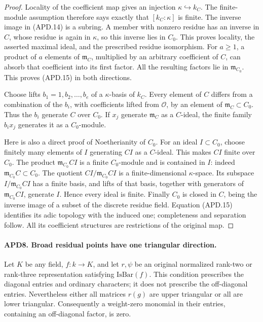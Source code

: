 \documentclass[11pt,a4paper]{article}
\numberwithin{equation}{section}
\theoremstyle{remark}\newtheorem{remark}[theorem]{Remark}
\begin{document}
\begin{proof}
Locality of the coefficient map gives an injection
\(\kappa\hookrightarrow k_C\).  The finite-module assumption
therefore says exactly that \([k_C:\kappa]\) is finite.
The inverse image in (APD.14) is a subring.  A member with nonzero
residue has an inverse in \(C\), whose residue is again in
\(\kappa\), so this inverse lies in \(C_0\).  This proves
locality, the asserted maximal ideal, and the prescribed residue
isomorphism.  For \(a\ge1\), a product of \(a\) elements
of \(\mathfrak m_C\), multiplied by an arbitrary coefficient
of \(C\), can absorb that coefficient into its first factor.
All the resulting factors lie in \(\mathfrak m_{C_0}\).
This proves (APD.15) in both directions.

Choose lifts \(b_1=1,b_2,\ldots,b_e\) of a
\(\kappa\)-basis of \(k_C\).  Every element of \(C\)
differs from a combination of the \(b_i\), with coefficients
lifted from \(\mathcal O\), by an element of
\(\mathfrak m_C\subset C_0\).  Thus the \(b_i\) generate
\(C\) over \(C_0\).  If \(x_j\) generate \(\mathfrak m_C\)
as a \(C\)-ideal, the finite family \(b_ix_j\) generates it
as a \(C_0\)-module.

Here is also a direct proof of Noetherianity of \(C_0\).
For an ideal \(I\subset C_0\), choose finitely many elements
of \(I\) generating \(CI\) as a \(C\)-ideal.  This makes
\(CI\) finite over \(C_0\).  The product
\(\mathfrak m_{C_0}CI\) is a finite \(C_0\)-module and is
contained in \(I\): indeed \(\mathfrak m_{C_0}C\subset C_0\).
The quotient \(CI/\mathfrak m_{C_0}CI\) is a finite-dimensional
\(\kappa\)-space.  Its subspace
\(I/\mathfrak m_{C_0}CI\) has a finite basis, and lifts of
that basis, together with generators of
\(\mathfrak m_{C_0}CI\), generate \(I\).  Hence every ideal
is finite.  Finally \(C_0\) is closed in \(C\), being the
inverse image of a subset of the discrete residue field.
Equation (APD.15) identifies its adic topology with the induced
one; completeness and separation follow.  All its coefficient
structures are restrictions of the original map.
\end{proof}

\paragraph{APD8. Broad residual points have one triangular direction.}
\label{claim:APD8}
Let \(K\) be any field, \(f:k\to K\), and let
\(r,\psi\) be an original normalized rank-two or rank-three
representation satisfying \(\mathrm{IsBar}(f)\).  This condition
prescribes the diagonal entries and ordinary characters; it does
not prescribe the off-diagonal entries.  Nevertheless either all
matrices \(r(g)\) are upper triangular or all are lower triangular.
Consequently a weight-zero monomial in their entries, containing
an off-diagonal factor, is zero.
\end{document}
